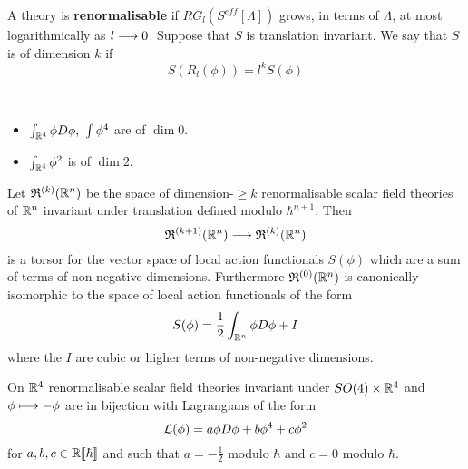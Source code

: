 \begin{definition}
  A theory is \textbf{renormalisable} if $RG_l(S^{eff}[\Lambda])$ grows, in terms of $\Lambda$, at most logarithmically as $l \longrightarrow 0$. Suppose that $S$ is translation invariant. We say that $S$ is of dimension $k$ if
  $$ S(R_l(\phi)) = l^k S(\phi) $$
\end{definition}

\begin{example}~
  \begin{itemize}
    \item $\int_{\RR^4} \phi D \phi, \ \int \phi^4$ are of $\dim 0$.
    \item $\int_{\RR^4} \phi^2$ is of $\dim 2$.
  \end{itemize}
\end{example}

\begin{theo}
  Let $\mathfrak{R}^{(k)}(\mathbb{R}^n)$ be the space of dimension-${\geq k}$ renormalisable scalar field theories of $\mathbb{R}^n$ invariant under translation defined modulo $\hbar^{n+1}$. Then
  $$  \mathfrak{R}^{(k+1)}(\mathbb{R}^n) \longrightarrow \mathfrak{R}^{(k)}(\mathbb{R}^n)$$
  is a torsor for the vector space of local action functionals $S(\phi)$ which are a sum of terms of non-negative dimensions. Furthermore $\mathfrak{R}^{(0)}(\mathbb{R}^n)$ is canonically isomorphic to the space of local action functionals of the form
  $$ S(\phi) = \frac{1}{2} \int_{\RR^n} \phi D \phi + I $$
  where the $I$ are cubic or higher terms of non-negative dimensions.
\end{theo}

\begin{corollary}
  On $\mathbb{R}^4$ renormalisable scalar field theories invariant under $SO(4) \times \mathbb{R}^4$ and $\phi \lmap -\phi$ are in bijection with Lagrangians of the form
  $$ \LL (\phi) = a \phi D \phi + b \phi^4 + c \phi^2 $$
  for $a,b,c \in \mathbb{R}\llbracket\hbar \rrbracket$ and such that $a = - \frac{1}{2}$ modulo $\hbar$ and $c = 0$ modulo $\hbar$.
\end{corollary}




\newpage
